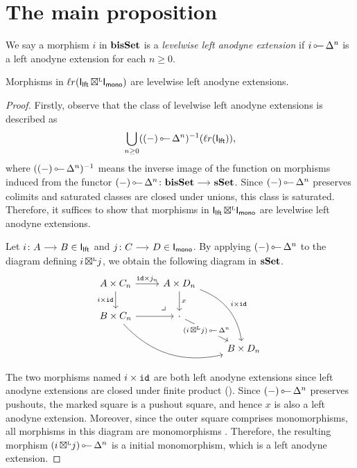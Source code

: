 \documentclass[a4paper,  dvipsnames, 11pt]{amsart}
\begin{document}
\section{The main proposition}
\begin{definition}
	We say a morphism $i$ in $\mathbf{bisSet}$ 
	is a \emph{levelwise left anodyne extension} if
	$i\lollipop \Delta^n$ is a left anodyne extension for each $n\geq 0$.
\end{definition}
\begin{lemma}
	\label{lem:bLeftbiAnovsLLAno}
	Morphisms in $\ell r(\mathsf{I}_{\mathsf{lft}}{\mathrel{\,\boxtimes^{\text{\tiny{L}}}}}\mathsf{I}_{\mathsf{mono}})$ are levelwise left anodyne extensions.
\end{lemma}
\begin{proof}
	Firstly, observe that the class of levelwise left anodyne extensions
	is described as
	\[
		\bigcup_{n\geq 0}
		((-)\lollipop {\Delta^n})^{-1}(\ell r(\I_\lft))
		\text{,}
	\]
	where $((-)\lollipop {\Delta^n})^{-1}$ means the inverse image of the function on morphisms
	induced from the functor $(-)\lollipop {\Delta^n}\colon\bisSet\arr\sSet$.
	Since $(-)\lollipop {\Delta^n}$ preserves colimits and saturated classes are closed under unions,
	this class is saturated.
	Therefore, it suffices to show that morphisms in $\mathsf{I}_{\mathsf{lft}}{\mathrel{\,\boxtimes^{\text{\tiny{L}}}}}\mathsf{I}_{\mathsf{mono}}$ are levelwise left anodyne extensions.

	Let $i\colon A\arr B\in\I_\lft$ and $j\colon C\arr D\in\I_\mono$.
	By applying $(-)\lollipop {\Delta^n}$ to the diagram defining $i{\mathrel{\,\boxtimes^{\text{\tiny{L}}}}} j$, we obtain the following diagram in $\mathbf{sSet}$.
	\[
		\begin{tikzcd}
			A\times C_n
			\ar[r,"\id\times j_n"]
			\ar[d,"i\times\id"']
				&
				A\times D_n
				\ar[d,"x"]
				\ar[rdd,bend left,"i\times\id"]
					&
			\\
			B\times C_n
			\ar[r]
			\ar[rrd,bend right]
				&
				\cdot
				\ar[rd,"{(i\boxtimesL j)\lollipop \Delta^n}"description]
				\pullback[lu]
					&
			\\
				&
					&
					B\times D_n
		\end{tikzcd}
	\]
	The two morphisms named $i\times\mathtt{id}$ are both left anodyne extensions since left anodyne extensions are closed under finite product (\cite[Proposition 3.4.3]{Cis19}).
	Since $(-)\lollipop\Delta^n$ preserves pushouts, the marked square is a pushout square, and hence $x$ is also a left anodyne extension.
	Moreover, since the outer square comprises monomorphisms, all morphisms in this diagram are monomorphisms .
	Therefore, the resulting morphism $(i\boxtimesL j)\lollipop\Delta^n$ is a initial monomorphism, which is a left anodyne extension.
\end{proof}
\end{document}
